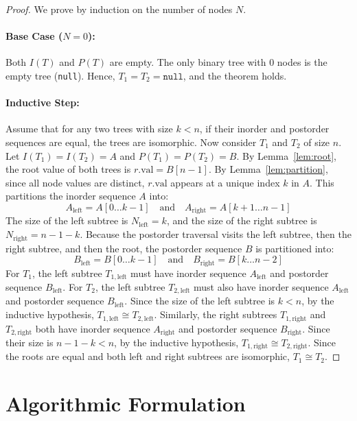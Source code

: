 \documentclass[10pt,journal,compsoc,onecolumn]{IEEEtran}
\begin{document}
\begin{proof}
We prove by induction on the number of nodes $N$.
\paragraph{Base Case ($N = 0$):} Both $I(T)$ and $P(T)$ are empty. The only binary tree with 0 nodes is the empty tree (\texttt{null}). Hence, $T_1 = T_2 = \texttt{null}$, and the theorem holds.

\paragraph{Inductive Step:} Assume that for any two trees with size $k < n$, if their inorder and postorder sequences are equal, the trees are isomorphic. Now consider $T_1$ and $T_2$ of size $n$.
Let $I(T_1) = I(T_2) = A$ and $P(T_1) = P(T_2) = B$. 
By Lemma~\ref{lem:root}, the root value of both trees is $r.\text{val} = B[n-1]$. 
By Lemma~\ref{lem:partition}, since all node values are distinct, $r.\text{val}$ appears at a unique index $k$ in $A$.
This partitions the inorder sequence $A$ into:
\[
A_{\text{left}} = A[0 \dots k-1] \quad \text{and} \quad A_{\text{right}} = A[k+1 \dots n-1]
\]
The size of the left subtree is $N_{\text{left}} = k$, and the size of the right subtree is $N_{\text{right}} = n - 1 - k$.
Because the postorder traversal visits the left subtree, then the right subtree, and then the root, the postorder sequence $B$ is partitioned into:
\[
B_{\text{left}} = B[0 \dots k-1] \quad \text{and} \quad B_{\text{right}} = B[k \dots n-2]
\]
For $T_1$, the left subtree $T_{1,\text{left}}$ must have inorder sequence $A_{\text{left}}$ and postorder sequence $B_{\text{left}}$.
For $T_2$, the left subtree $T_{2,\text{left}}$ must also have inorder sequence $A_{\text{left}}$ and postorder sequence $B_{\text{left}}$.
Since the size of the left subtree is $k < n$, by the inductive hypothesis, $T_{1,\text{left}} \cong T_{2,\text{left}}$.
Similarly, the right subtrees $T_{1,\text{right}}$ and $T_{2,\text{right}}$ both have inorder sequence $A_{\text{right}}$ and postorder sequence $B_{\text{right}}$. Since their size is $n - 1 - k < n$, by the inductive hypothesis, $T_{1,\text{right}} \cong T_{2,\text{right}}$.
Since the roots are equal and both left and right subtrees are isomorphic, $T_1 \cong T_2$.
\end{proof}

\section{Algorithmic Formulation}
\label{sec:algorithm}
\end{document}
